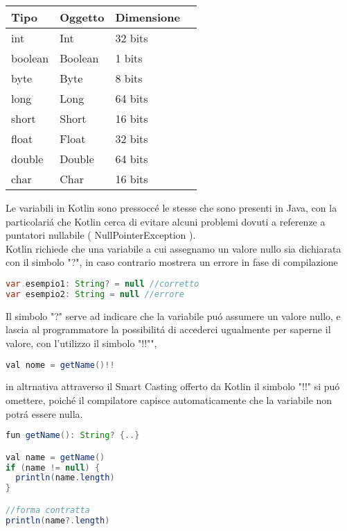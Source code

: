 \begin{center}
    \begin{tabular}{ | l | l | l | p{5cm} |}
    \hline
    Tipo & Oggetto & Dimensione \\ \hline
    int & Int & 32 bits\\ \hline
    boolean & Boolean & 1 bits\\ \hline
    byte & Byte & 8 bits\\ \hline
    long & Long & 64 bits\\ \hline
    short & Short & 16 bits\\ \hline
    float & Float & 32 bits\\ \hline
    double & Double & 64 bits\\ \hline
    char & Char & 16 bits\\ \hline

    \end{tabular}
\end{center}

Le variabili in Kotlin sono pressocc\'e le stesse che sono presenti in Java, con la particolari\'a
che Kotlin cerca di evitare alcuni problemi dovuti a referenze a puntatori nullabile ( NullPointerException ). \\
Kotlin richiede che una variabile a cui assegnamo un valore nullo sia dichiarata con il simbolo "?", in caso contrario mostrera un errore in fase di compilazione

\begin{lstlisting}[language=java,caption={Esempio}]
var esempio1: String? = null //corretto
var esempio2: String = null //errore
\end{lstlisting}

Il simbolo "?" serve ad indicare che la variabile pu\'o assumere un valore nullo, e lascia al programmatore la possibilit\'a di accederci ugualmente per saperne il valore, con l'utilizzo il simbolo "!!"",


\begin{lstlisting}[language=java,caption={Esempio !!}]
val nome = getName()!!
\end{lstlisting}

in altrnativa attraverso il Smart Casting offerto da Kotlin il simbolo "!!" si pu\'o omettere, poich\'e il compilatore capisce automaticamente che la variabile non potr\'a essere nulla.

\begin{lstlisting}[language=java,caption={Smart Casting}]
fun getName(): String? {..}

val name = getName()
if (name != null) {
  println(name.length)
}

//forma contratta
println(name?.length)
\end{lstlisting}

